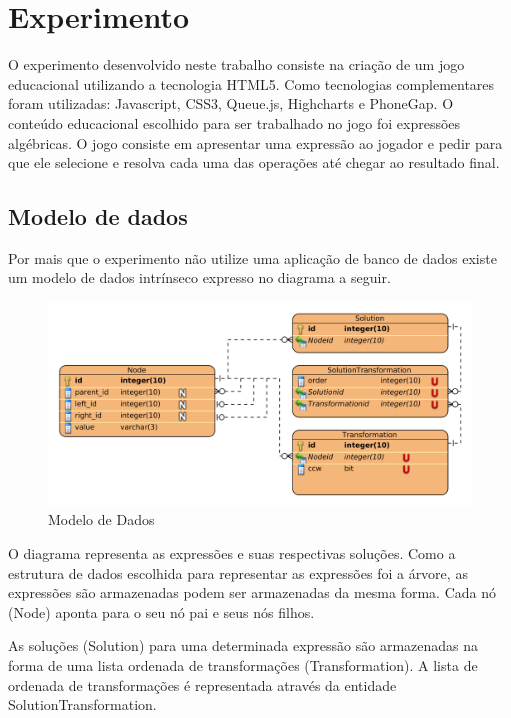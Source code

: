 \part{Experimento}
O experimento desenvolvido neste trabalho consiste na criação de um jogo educacional utilizando a tecnologia HTML5. Como tecnologias complementares foram utilizadas: Javascript, CSS3, Queue.js, Highcharts e PhoneGap. O conteúdo educacional escolhido para ser trabalhado no jogo foi expressões algébricas. O jogo consiste em apresentar uma expressão ao jogador e pedir para que ele selecione e resolva cada uma das operações até chegar ao resultado final.

\chapter{Modelo de dados}
Por mais que o experimento não utilize uma aplicação de banco de dados existe um modelo de dados intrínseco expresso no diagrama a seguir.

\begin{figure}[H]
	\caption{\label{gram_cls}Modelo de Dados}
	\begin{center}
	    \includegraphics[scale=0.9]{datamodel.png}
	\end{center}
\end{figure}

O diagrama representa as expressões e suas respectivas soluções. Como a estrutura de dados escolhida para representar as expressões foi a árvore, as expressões são armazenadas podem ser armazenadas da mesma forma. Cada nó (Node) aponta para o seu nó pai e seus nós filhos.

As soluções (Solution) para uma determinada expressão são armazenadas na forma de uma lista ordenada de transformações (Transformation). A lista de ordenada de transformações é representada através da entidade SolutionTransformation.


